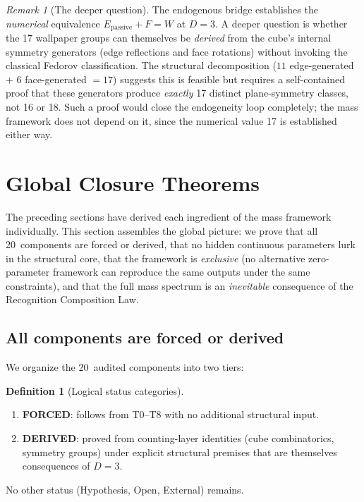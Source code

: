 \documentclass[11pt,a4paper]{article}
\theoremstyle{definition}
\newtheorem{definition}[theorem]{Definition}
\theoremstyle{remark}
\newtheorem{remark}[theorem]{Remark}
\newcommand{\Epass}{E_{\mathrm{passive}}}
\begin{document}
\begin{remark}[The deeper question]
\label{rem:wallpaper_deeper}
The endogenous bridge establishes the \emph{numerical} equivalence
$\Epass + F = W$ at $D = 3$.  A deeper question is whether the 17 wallpaper
groups can themselves be \emph{derived} from the cube's internal symmetry
generators (edge reflections and face rotations) without invoking the
classical Fedorov classification.  The structural decomposition
($11$ edge-generated $+$ $6$ face-generated $= 17$) suggests this is
feasible but requires a self-contained proof that these generators produce
\emph{exactly} 17 distinct plane-symmetry classes, not 16 or 18.  Such a
proof would close the endogeneity loop completely; the mass framework does
not depend on it, since the numerical value 17 is established either way.
\end{remark}


\section{Global Closure Theorems}
\label{sec:closure}

The preceding sections have derived each ingredient of the mass framework
individually.  This section assembles the global picture: we prove that all
20~components are forced or derived, that no hidden continuous parameters
lurk in the structural core, that the framework is \emph{exclusive} (no
alternative zero-parameter framework can reproduce the same outputs under
the same constraints), and that the full mass spectrum is an
\emph{inevitable} consequence of the Recognition Composition Law.

\subsection{All components are forced or derived}

We organize the 20~audited components into two tiers:

\begin{definition}[Logical status categories]
\label{def:status_categories}
\leavevmode
\begin{enumerate}[nosep]
  \item \textbf{FORCED}: follows from T0--T8 with no additional structural
        input.
  \item \textbf{DERIVED}: proved from counting-layer identities
        (cube combinatorics, symmetry groups) under explicit structural
        premises that are themselves consequences of $D = 3$.
\end{enumerate}
No other status (Hypothesis, Open, External) remains.
\end{definition}
\end{document}
